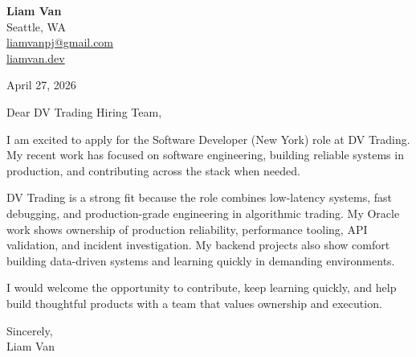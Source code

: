 \documentclass[letterpaper,11pt]{article}
\begin{document}
\begin{flushleft}
\textbf{\Large Liam Van} \\
Seattle, WA \\
\href{mailto:liamvanpj@gmail.com}{liamvanpj@gmail.com} \\
\href{https://liamvan.dev}{liamvan.dev}
\end{flushleft}

April 27, 2026

\noindent Dear DV Trading Hiring Team,

\noindent I am excited to apply for the Software Developer (New York) role at DV Trading. My recent work has focused on software engineering, building reliable systems in production, and contributing across the stack when needed.

\noindent DV Trading is a strong fit because the role combines low-latency systems, fast debugging, and production-grade engineering in algorithmic trading. My Oracle work shows ownership of production reliability, performance tooling, API validation, and incident investigation. My backend projects also show comfort building data-driven systems and learning quickly in demanding environments.

\noindent I would welcome the opportunity to contribute, keep learning quickly, and help build thoughtful products with a team that values ownership and execution.

\noindent Sincerely, \\
Liam Van
\end{document}
